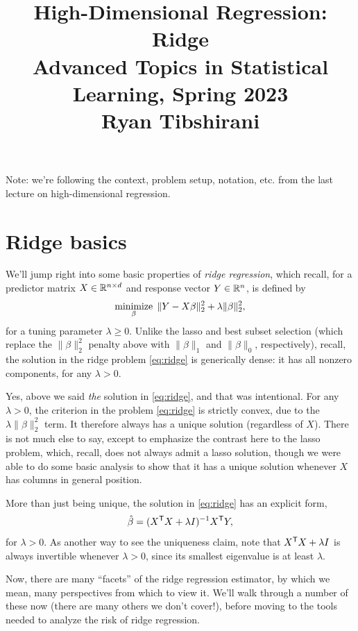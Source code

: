 \documentclass{article}
\title{High-Dimensional Regression: Ridge \\ \smallskip
\large Advanced Topics in Statistical Learning, Spring 2023 \\ \smallskip
Ryan Tibshirani}
\date{}
\begin{document}
\maketitle
\RaggedRight
\vspace{-50pt}

Note: we're following the context, problem setup, notation, etc. from the last
lecture on high-dimensional regression.

\section{Ridge basics}

We'll jump right into some basic properties of \emph{ridge regression}, which
recall, for a predictor matrix $X \in \mathbb{R}^{n \times d}$ and response vector $Y
\in \mathbb{R}^n$, is defined by
\begin{equation}
\label{eq:ridge}
\mathop{\mathrm{minimize}}_\beta \; \|Y - X\beta\|_2^2 + \lambda \|\beta\|_2^2, 
\end{equation}
for a tuning parameter $\lambda \geq 0$. Unlike the lasso and best subset
selection (which replace the $\|\beta\|_2^2$ penalty above with $\|\beta\|_1$
and $\|\beta\|_0$, respectively), recall, the solution in the ridge problem
\eqref{eq:ridge} is generically dense: it has all nonzero components, for any
$\lambda > 0$.  

Yes, above we said \emph{the} solution in \eqref{eq:ridge}, and that was 
intentional. For any $\lambda > 0$, the criterion in the problem
\eqref{eq:ridge} is strictly convex, due to the $\lambda \|\beta\|_2^2$ term. It
therefore always has a unique solution (regardless of $X$). There is not much
else to say, except to emphasize the contrast here to the lasso problem, which,
recall, does not always admit a lasso solution, though we were able to do some
basic analysis to show that it has a unique solution whenever $X$ has columns in
general position.      

More than just being unique, the solution in \eqref{eq:ridge} has an explicit
form,
\begin{equation}
\label{eq:ridge_sol}
\hat{\beta} = (X^{\mathsf{T}} X + \lambda I)^{-1} X^{\mathsf{T}} Y,
\end{equation}
for $\lambda > 0$. As another way to see the uniqueness claim, note that $X^{\mathsf{T}} X
+ \lambda I$ is always invertible whenever $\lambda > 0$, since its smallest
eigenvalue is at least $\lambda$. 

Now, there are many ``facets'' of the ridge regression estimator, by which we
mean, many perspectives from which to view it. We'll walk through a number of
these now (there are many others we don't cover!), before moving to the tools
needed to analyze the risk of ridge regression.   
\end{document}
